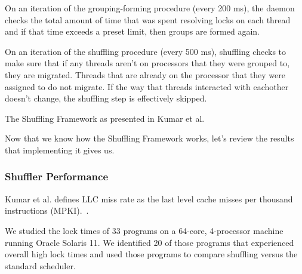 \documentclass{sig-alternate}
\begin{document}
On an iteration of the grouping-forming procedure (every 200 ms), the daemon checks the total amount of time that was spent resolving locks on each thread and if that time exceeds a preset limit, then groups are formed again.

On an iteration of the shuffling procedure (every 500 ms), shuffling checks to make sure that if any threads aren't on processors that they were grouped to, they are migrated. Threads that are already on the processor that they were assigned to do not migrate. If the way that threads interacted with eachother doesn't change, the shuffling step is effectively skipped.~\cite{KumarEtal:2014}

\begin{algorithm}


	\caption{The Shuffling Framework
	as presented in Kumar et al.~\cite{KumarEtal:2014}}\label{euclid}\label{alg:shuffler}
\end{algorithm}

Now that we know how the Shuffling Framework works, let's review the results that implementing it gives us.

\subsubsection{Shuffler Performance}
\label{sec:shuf_performance}

Kumar et al. defines LLC miss rate as the last level cache misses per thousand instructions (MPKI).~\cite{KumarEtal:2014}.

We studied the lock times of 33 programs on a 64-core, 4-processor machine running Oracle Solaris 11. We identified 20 of those programs that experienced overall high lock times and used those programs to compare shuffling versus the standard scheduler.~\cite{KumarEtal:2014}

\end{document}
